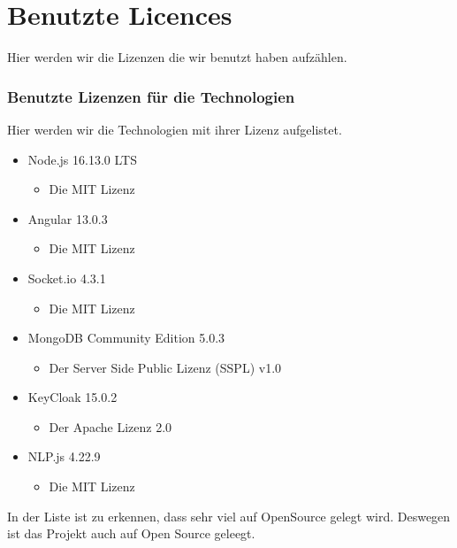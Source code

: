 \section{Benutzte Licences}
Hier werden wir die Lizenzen die wir benutzt haben aufzählen.

\subsubsection{Benutzte Lizenzen für die Technologien}
Hier werden wir die Technologien mit ihrer Lizenz aufgelistet.

\begin{itemize}
    \item Node.js 16.13.0 LTS 
    \begin{itemize}
        \item Die MIT Lizenz
    \end{itemize}
    \item Angular 13.0.3
    \begin{itemize}
        \item Die MIT Lizenz
    \end{itemize}
    \item Socket.io 4.3.1
    \begin{itemize}
        \item Die MIT Lizenz
    \end{itemize}
    \item MongoDB Community Edition 5.0.3
    \begin{itemize}
        \item Der Server Side Public Lizenz (SSPL) v1.0
    \end{itemize}
    \item KeyCloak 15.0.2
    \begin{itemize}
        \item Der Apache Lizenz 2.0
    \end{itemize}
    \item NLP.js 4.22.9
    \begin{itemize}
        \item Die MIT Lizenz
    \end{itemize}
\end{itemize}

\noindent In der Liste ist zu erkennen, dass sehr viel auf OpenSource gelegt wird.
Deswegen ist das Projekt auch auf Open Source geleegt.